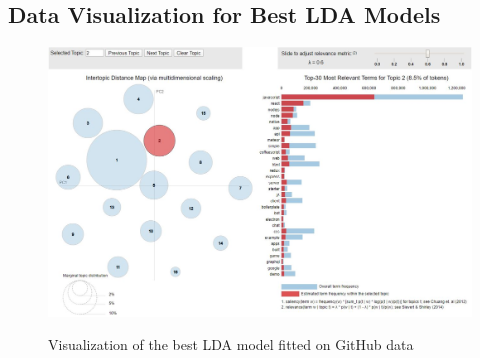             \begin{table}
                \centering
              \caption{Parameters of Models from Experiment 2B - Expertise Extraction from Stack Overflow Data} \label{tab:SO_params2}
                \vspace{6pt} %
            \end{table}
            
        \subsection{Data Visualization for Best LDA Models\label{pyldaviz}}
            \begin{figure}
              \centering
              \includegraphics[width=\textwidth]{figures/pyLDAviz_GH.JPG}\\
              \caption{Visualization of the best LDA model fitted on GitHub data}
              \label{fig:pyldaviz_GH}
            \end{figure}
            
